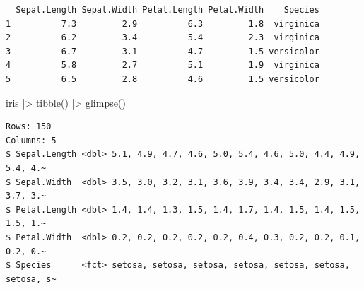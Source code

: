 \documentclass[
  letterpaper,
  DIV=11,
  numbers=noendperiod]{scrreprt}
\newenvironment{Shaded}{\begin{snugshade}}{\end{snugshade}}
\newcommand{\CommentTok}[1]{\textcolor[rgb]{0.37,0.37,0.37}{#1}}
\newcommand{\FunctionTok}[1]{\textcolor[rgb]{0.28,0.35,0.67}{#1}}
\newcommand{\NormalTok}[1]{\textcolor[rgb]{0.00,0.23,0.31}{#1}}
\newcommand{\SpecialCharTok}[1]{\textcolor[rgb]{0.37,0.37,0.37}{#1}}
\begin{document}
\begin{verbatim}
  Sepal.Length Sepal.Width Petal.Length Petal.Width    Species
1          7.3         2.9          6.3         1.8  virginica
2          6.2         3.4          5.4         2.3  virginica
3          6.7         3.1          4.7         1.5 versicolor
4          5.8         2.7          5.1         1.9  virginica
5          6.5         2.8          4.6         1.5 versicolor
\end{verbatim}

\begin{Shaded}
\begin{Highlighting}[]
\NormalTok{iris }\SpecialCharTok{|\textgreater{}} \FunctionTok{tibble}\NormalTok{() }\SpecialCharTok{|\textgreater{}} \FunctionTok{glimpse}\NormalTok{()}
\end{Highlighting}
\end{Shaded}

\begin{verbatim}
Rows: 150
Columns: 5
$ Sepal.Length <dbl> 5.1, 4.9, 4.7, 4.6, 5.0, 5.4, 4.6, 5.0, 4.4, 4.9, 5.4, 4.~
$ Sepal.Width  <dbl> 3.5, 3.0, 3.2, 3.1, 3.6, 3.9, 3.4, 3.4, 2.9, 3.1, 3.7, 3.~
$ Petal.Length <dbl> 1.4, 1.4, 1.3, 1.5, 1.4, 1.7, 1.4, 1.5, 1.4, 1.5, 1.5, 1.~
$ Petal.Width  <dbl> 0.2, 0.2, 0.2, 0.2, 0.2, 0.4, 0.3, 0.2, 0.2, 0.1, 0.2, 0.~
$ Species      <fct> setosa, setosa, setosa, setosa, setosa, setosa, setosa, s~
\end{verbatim}

\begin{Shaded}
\end{Shaded}
\end{document}
